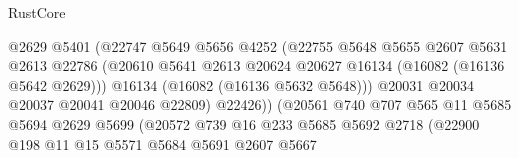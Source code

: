 \begin{lexlean}{RustCore}
\begin{coremodule}
                                        @2629
                                        @5401
                                        (@22747
                                          @5649
                                          @5656
                                          @4252
                                          (@22755
                                            @5648
                                            @5655
                                            @2607
                                            @5631
                                            @2613
                                            @22786
                                            (@20610
                                              @5641
                                              @2613
                                              @20624
                                              @20627
                                              @16134
                                              (@16082 (@16136 @5642 @2629)))
                                            @16134
                                            (@16082 (@16136 @5632 @5648)))
                                          @20031
                                          @20034
                                          @20037
                                          @20041
                                          @20046
                                          @22809)
                                        @22426))
                                    (@20561
                                      @740
                                      @707
                                      @565
                                      @11
                                      @5685
                                      @5694
                                      @2629
                                      @5699
                                      (@20572
                                        @739
                                        @16
                                        @233
                                        @5685
                                        @5692
                                        @2718
                                        (@22900
                                          @198
                                          @11
                                          @15
                                          @5571
                                          @5684
                                          @5691
                                          @2607
                                          @5667

\end{coremodule}
\end{lexlean}
